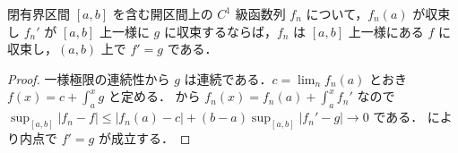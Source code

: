 \begin{prop}[導函数列の一様収束による項別微分]
閉有界区間 $[a,b]$ を含む開区間上の $C^1$ 級函数列 $f_n$ について，$f_n(a)$ が収束し $f_n'$ が $[a,b]$ 上一様に $g$ に収束するならば，$f_n$ は $[a,b]$ 上一様にある $f$ に収束し，$(a,b)$ 上で $f'=g$ である．
\end{prop}
\begin{proof}
一様極限の連続性から $g$ は連続である．$c=\lim_n f_n(a)$ とおき $f(x)=c+\int_a^x g$ と定める． から $f_n(x)=f_n(a)+\int_a^x f_n'$ なので $\sup_{[a,b]}|f_n-f|\leq|f_n(a)-c|+(b-a)\sup_{[a,b]}|f_n'-g|\to0$ である． により内点で $f'=g$ が成立する．
\end{proof}
